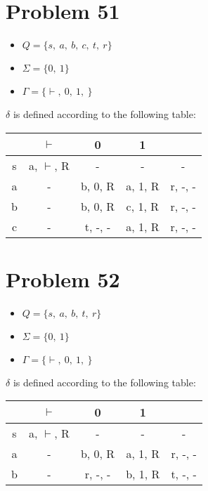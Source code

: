 \documentclass[11pt]{article}
\begin{document}
\section*{Problem 51}

\begin{itemize}
	\item $Q = \{ s,\ a,\ b,\ c,\ t,\ r \}$
	\item $\Sigma = \{0,\ 1\}$
	\item $\Gamma = \{ \vdash,\ 0,\ 1,\ $\textvisiblespace$\}$
\end{itemize}

$\delta$ is defined according to the following table:


\begin{tabular}{ c | c | c | c | c }
			& $\vdash$				& 0 					& 1				& \textvisiblespace \\
		\hline
		s	& a, $\vdash$, R		& -					& -				& - \\
		a	& -							& b, 0, R			& a, 1, R		& r, -, - \\
		b	& -							& b, 0, R			& c, 1, R		& r, -, - \\
		c	& -							& t, -, -				& a, 1, R		& r, -, -
\end{tabular}


\section*{Problem 52}

\begin{itemize}
	\item $Q = \{ s,\ a,\ b,\ t,\ r \}$
	\item $\Sigma = \{0,\ 1\}$
	\item $\Gamma = \{ \vdash,\ 0,\ 1,\ $\textvisiblespace$\}$
\end{itemize}

$\delta$ is defined according to the following table:


\begin{tabular}{ c | c | c | c | c }
			& $\vdash$				& 0 					& 1				& \textvisiblespace \\
		\hline
		s	& a, $\vdash$, R		& -					& -				& - \\
		a	& -							& b, 0, R			& a, 1, R		& r, -, - \\
		b	& -							& r, -, -				& b, 1, R		& t, -, - \\
\end{tabular}
\end{document}
